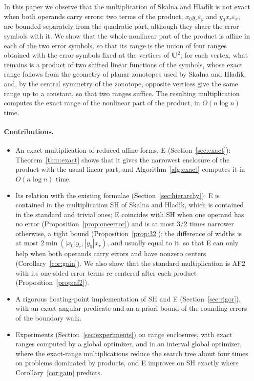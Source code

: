 \documentclass[10pt]{article}
\theoremstyle{definition}
\newcommand{\U}{\mathbf{U}}
\newcommand{\eps}{\varepsilon}
\newcommand{\ex}{\eps_x}
\newcommand{\ey}{\eps_y}
\begin{document}
In this paper we observe that the multiplication of Skalna and Hlad\'{\i}k is not exact when both operands carry errors: two terms of the product, $x_0 y_r\ey$ and $y_0 x_r\ex$, are bounded separately from the quadratic part, although they share the error symbols with it. We show that the whole nonlinear part of the product is affine in each of the two error symbols, so that its range is the union of four ranges obtained with the error symbols fixed at the vertices of $\U^2$; for each vertex, what remains is a product of two shifted linear functions of the symbols, whose exact range follows from the geometry of planar zonotopes used by Skalna and Hlad\'{\i}k, and, by the central symmetry of the zonotope, opposite vertices give the same range up to a constant, so that two ranges suffice. The resulting multiplication computes the exact range of the nonlinear part of the product, in $O(n\log n)$ time.

\paragraph{Contributions.}
\begin{itemize}
\item An exact multiplication of reduced affine forms, E (Section~\ref{sec:exact}): Theorem~\ref{thm:exact} shows that it gives the narrowest enclosure of the product with the usual linear part, and Algorithm~\ref{alg:exact} computes it in $O(n\log n)$ time.
\item Its relation with the existing formulae (Section~\ref{sec:hierarchy}): E is contained in the multiplication SH of Skalna and Hlad\'{\i}k, which is contained in the standard and trivial ones; E coincides with SH when one operand has no error (Proposition~\ref{prop:oneerror}) and is at most $3/2$ times narrower otherwise, a tight bound (Proposition~\ref{prop:32}); the difference of widths is at most $2\min(|x_0|y_r,|y_0|x_r)$, and usually equal to it, so that E can only help when both operands carry errors and have nonzero centers (Corollary~\ref{cor:gain}). We also show that the standard multiplication is AF2~\cite{messine2002extentions} with its one-sided error terms re-centered after each product (Proposition~\ref{prop:af2}).
\item A rigorous floating-point implementation of SH and E (Section~\ref{sec:rigor}), with an exact angular predicate and an a priori bound of the rounding errors of the boundary walk.
\item Experiments (Section~\ref{sec:experiments}) on range enclosures, with exact ranges computed by a global optimizer, and in an interval global optimizer, where the exact-range multiplications reduce the search tree about four times on problems dominated by products, and E improves on SH exactly where Corollary~\ref{cor:gain} predicts.
\end{itemize}
\end{document}
